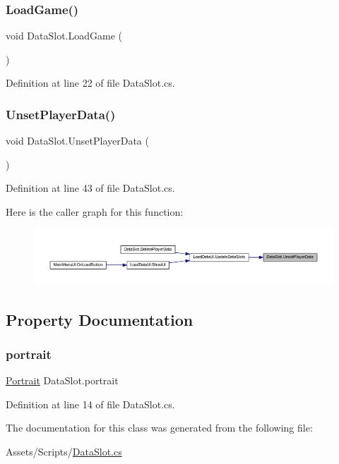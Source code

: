 \subsubsection{\texorpdfstring{LoadGame()}{LoadGame()}}
{\footnotesize\ttfamily void Data\+Slot.\+Load\+Game (\begin{DoxyParamCaption}{ }\end{DoxyParamCaption})}



Definition at line 22 of file Data\+Slot.\+cs.

\mbox{\label{class_data_slot_a2d8c55c9436701f7d2a12ab7388dcdec}} 
\subsubsection{\texorpdfstring{UnsetPlayerData()}{UnsetPlayerData()}}
{\footnotesize\ttfamily void Data\+Slot.\+Unset\+Player\+Data (\begin{DoxyParamCaption}{ }\end{DoxyParamCaption})}



Definition at line 43 of file Data\+Slot.\+cs.

Here is the caller graph for this function\+:
\nopagebreak
\begin{figure}[H]
\begin{center}
\leavevmode
\includegraphics[width=350pt]{class_data_slot_a2d8c55c9436701f7d2a12ab7388dcdec_icgraph}
\end{center}
\end{figure}


\subsection{Property Documentation}
\mbox{\label{class_data_slot_abe2454953aa5b018407db6ebbdc18083}} 
\subsubsection{\texorpdfstring{portrait}{portrait}}
{\footnotesize\ttfamily \mbox{\hyperlink{class_portrait}{Portrait}} Data\+Slot.\+portrait\hspace{0.3cm}{\ttfamily [get]}}



Definition at line 14 of file Data\+Slot.\+cs.



The documentation for this class was generated from the following file\+:\begin{DoxyCompactItemize}
\item 
Assets/\+Scripts/\mbox{\hyperlink{_data_slot_8cs}{Data\+Slot.\+cs}}\end{DoxyCompactItemize}
